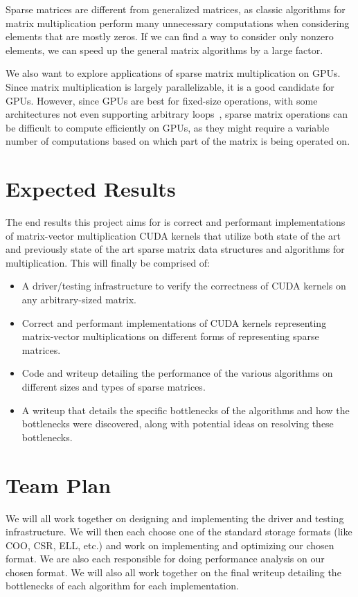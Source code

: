 \documentclass[11pt]{article}
\begin{document}
Sparse matrices are different from generalized matrices, as classic algorithms for matrix multiplication perform many unnecessary computations when considering elements that are mostly zeros.
If we can find a way to consider only nonzero elements, we can speed up the general matrix algorithms by a large factor.

We also want to explore applications of sparse matrix multiplication on GPUs.
Since matrix multiplication is largely parallelizable, it is a good candidate for GPUs.
However, since GPUs are best for fixed-size operations, with some architectures not even supporting arbitrary loops~\cite{redhat}, sparse matrix operations can be difficult to compute efficiently on GPUs, as they might require a variable number of computations based on which part of the matrix is being operated on.

\section{Expected Results}

The end results this project aims for is correct and performant implementations of matrix-vector multiplication CUDA kernels that utilize both state of the art and previously state of the art sparse matrix data structures and algorithms for multiplication. This will finally be comprised of:

\begin{itemize}
    \item A driver/testing infrastructure to verify the correctness of CUDA kernels on any arbitrary-sized matrix.
    \item Correct and performant implementations of CUDA kernels representing matrix-vector multiplications on different forms of representing sparse matrices.
    \item Code and writeup detailing the performance of the various algorithms on different sizes and types of sparse matrices.
    \item A writeup that details the specific bottlenecks of the algorithms and how the bottlenecks were discovered, along with potential ideas on resolving these bottlenecks.
\end{itemize}


\section*{Team Plan}


We will all work together on designing and implementing the driver and testing infrastructure.
We will then each choose one of the standard storage formats (like COO, CSR, ELL, etc.) and work on implementing and optimizing our chosen format.
We are also each responsible for doing performance analysis on our chosen format.
We will also all work together on the final writeup detailing the bottlenecks of each algorithm for each implementation.



\end{document}
